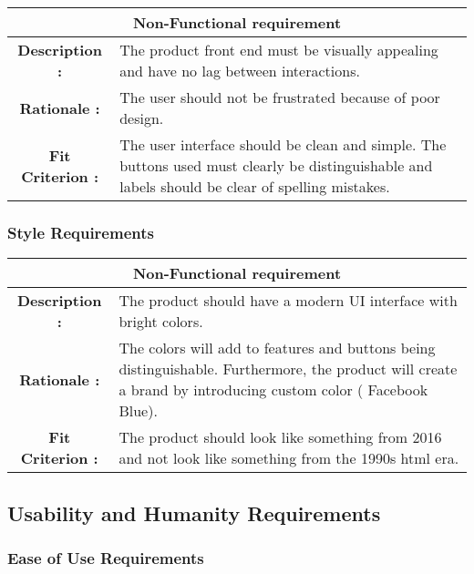 \documentclass[12pt, titlepage]{article}
\begin{document}
\begin{center}
\begin{table}[H]
\begin{tabularx}{\textwidth}{| c X |}
\hline
\multicolumn{2}{|c|}{\textbf{Non-Functional requirement}}\\
\hline
\textbf{Description : } & The product front end must be visually appealing and have no lag between interactions. \\
\hline
\textbf{Rationale : } & The user should not be frustrated because of poor design.\\
\hline
\textbf{Fit Criterion : } &  The user interface should be clean and simple. The buttons used must clearly be distinguishable and labels should be clear of spelling mistakes.\\
\hline
\end{tabularx}
\end{table}
\end{center}

\subsubsection{Style Requirements}

\begin{center}
\begin{table}[H]
\begin{tabularx}{\textwidth}{| c X |}
\hline
\multicolumn{2}{|c|}{\textbf{Non-Functional requirement}}\\
\hline
\textbf{Description : } & The product should have a modern UI interface with bright colors. \\
\hline
\textbf{Rationale : } & The colors will add to features and buttons being distinguishable. Furthermore, the product will create a brand by introducing custom color ( Facebook Blue).\\
\hline
\textbf{Fit Criterion : } &  The product should look like something from 2016 and not look like something from the 1990s html era.\\
\hline
\end{tabularx}
\end{table}
\end{center}

\subsection{Usability and Humanity Requirements}

\subsubsection{Ease of Use Requirements}
\end{document}
